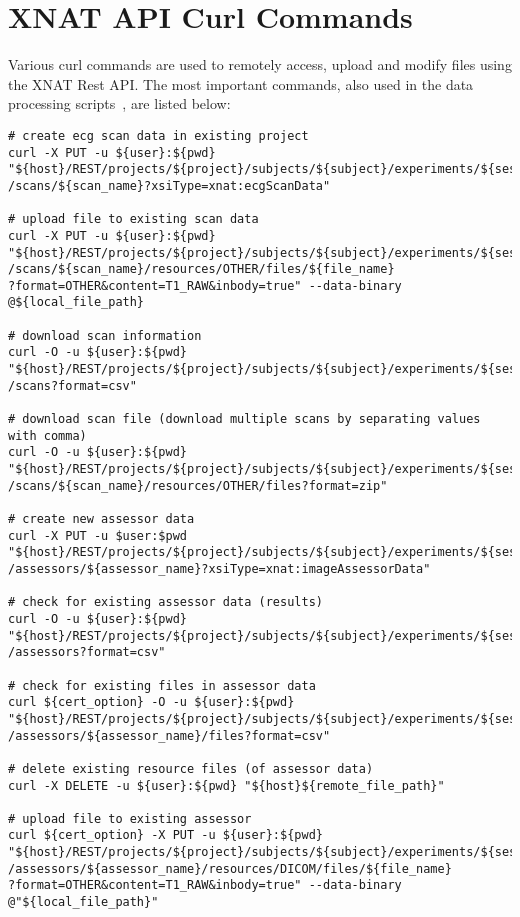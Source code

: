 \section{XNAT API Curl Commands} \label{xnatapi}

Various curl commands are used to remotely access, upload and modify files using the XNAT Rest API.
The most important commands, also used in the data processing scripts~\cite{customscripts}, are listed below:

\begin{mylisting}
\begin{verbatim}
# create ecg scan data in existing project
curl -X PUT -u ${user}:${pwd} "${host}/REST/projects/${project}/subjects/${subject}/experiments/${session}
/scans/${scan_name}?xsiType=xnat:ecgScanData"

# upload file to existing scan data
curl -X PUT -u ${user}:${pwd} "${host}/REST/projects/${project}/subjects/${subject}/experiments/${session}
/scans/${scan_name}/resources/OTHER/files/${file_name}
?format=OTHER&content=T1_RAW&inbody=true" --data-binary @${local_file_path}

# download scan information
curl -O -u ${user}:${pwd} "${host}/REST/projects/${project}/subjects/${subject}/experiments/${session}
/scans?format=csv"
  
# download scan file (download multiple scans by separating values with comma)
curl -O -u ${user}:${pwd} "${host}/REST/projects/${project}/subjects/${subject}/experiments/${session}
/scans/${scan_name}/resources/OTHER/files?format=zip"

# create new assessor data
curl -X PUT -u $user:$pwd "${host}/REST/projects/${project}/subjects/${subject}/experiments/${session}
/assessors/${assessor_name}?xsiType=xnat:imageAssessorData"

# check for existing assessor data (results)
curl -O -u ${user}:${pwd} "${host}/REST/projects/${project}/subjects/${subject}/experiments/${session}
/assessors?format=csv"

# check for existing files in assessor data
curl ${cert_option} -O -u ${user}:${pwd} "${host}/REST/projects/${project}/subjects/${subject}/experiments/${session}
/assessors/${assessor_name}/files?format=csv"

# delete existing resource files (of assessor data)
curl -X DELETE -u ${user}:${pwd} "${host}${remote_file_path}"

# upload file to existing assessor
curl ${cert_option} -X PUT -u ${user}:${pwd} "${host}/REST/projects/${project}/subjects/${subject}/experiments/${session}
/assessors/${assessor_name}/resources/DICOM/files/${file_name}
?format=OTHER&content=T1_RAW&inbody=true" --data-binary @"${local_file_path}"

\end{verbatim}
\end{mylisting}